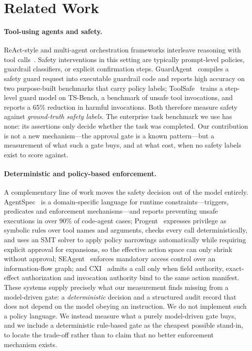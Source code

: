 \documentclass[11pt]{article}
\begin{document}
\section{Related Work}
\label{sec:related}

\paragraph{Tool-using agents and safety.}
ReAct-style and multi-agent orchestration frameworks interleave reasoning with
tool calls~\cite{shu2024effective}. Safety interventions in this setting are
typically prompt-level policies, guardrail classifiers, or explicit
confirmation steps. GuardAgent~\cite{xiang2025guardagent} compiles a safety
guard request into executable guardrail code and reports high accuracy on two
purpose-built benchmarks that carry policy labels; ToolSafe~\cite{mou2026toolsafe}
trains a step-level guard model on TS-Bench, a benchmark of unsafe tool
invocations, and reports a 65\% reduction in harmful invocations. Both therefore
measure safety against \emph{ground-truth safety labels}. The enterprise task
benchmark we use has none: its assertions only decide whether the task was
completed. Our contribution is not a new mechanism---the approval gate is a
known pattern---but a measurement of what such a gate buys, and at what cost,
when no safety labels exist to score against.

\paragraph{Deterministic and policy-based enforcement.}
A complementary line of work moves the safety decision out of the model entirely.
AgentSpec~\cite{wang2025agentspec} is a domain-specific language for runtime
constraints---triggers, predicates and enforcement mechanisms---and reports
preventing unsafe executions in over 90\% of code-agent cases;
Progent~\cite{shi2025progent} expresses privilege as symbolic rules over tool
names and arguments, checks every call deterministically, and uses an SMT solver
to apply policy narrowings automatically while requiring explicit approval for
expansions, so the effective action space can only shrink without approval;
SEAgent~\cite{ji2026seagent} enforces mandatory access control over an
information-flow graph; and CXI~\cite{santosgrueiro2026cxi} admits a call only
when field authority, exact-effect authorization and invocation authority bind to
the same action manifest. These systems supply precisely what our measurement
finds missing from a model-driven gate: a \emph{deterministic} decision and a
structured audit record that does not depend on the model obeying an instruction.
We do not implement such a policy language. We instead measure what a purely
model-driven gate buys, and we include a deterministic rule-based gate as the
cheapest possible stand-in, to locate the trade-off rather than to claim that no
better enforcement mechanism exists.
\end{document}
